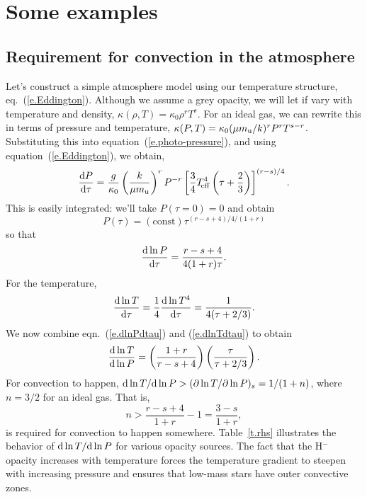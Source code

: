 \section{Some examples}

\subsection{Requirement for convection in the atmosphere}\label{s.atmosphere-convection}

Let's construct a simple atmosphere model using our temperature structure, eq.~(\ref{e.Eddington}).  Although we assume a grey opacity, we will let if vary with temperature and density, $\kappa(\rho,T) = \kappa_{0}\rho^{r}T^{s}$.  For an ideal gas, we can rewrite this in terms of pressure and temperature, $\kappa(P,T) = \kappa_{0} (\mu m_\mathrm{u}/k)^{r}P^{r} T^{s-r}$.  Substituting this into equation~(\ref{e.photo-pressure}), and using equation~(\ref{e.Eddington}), we obtain,
\[
  \frac{\mathrm{d} P}{\mathrm{d} \tau} = \frac{g}{\kappa_{0}}\left(\frac{k}{\mu m_\mathrm{u}}\right)^{r} P^{-r} \left[\frac{3}{4}T_{\!\mathrm{eff}}^{4}\left(\tau + \frac{2}{3}\right)\right]^{(r-s)/4}.
\]
This is easily integrated: we'll take $P(\tau = 0) = 0$ and obtain
\[
  P(\tau) = (\mathrm{const})\tau^{(r-s+4)/4/(1+r)}
\]
so that
\begin{equation}\label{e.dlnPdtau}
  \frac{\mathrm{d} \ln P}{\mathrm{d} \tau} = \frac{r-s+4}{4(1+r)\tau}.
\end{equation}
For the temperature,
\begin{equation}\label{e.dlnTdtau}
 \frac{\mathrm{d}\ln T}{\mathrm{d}\tau} = \frac{1}{4}\frac{\mathrm{d}\ln T^{4}}{\mathrm{d} \tau} = \frac{1}{4(\tau + 2/3)}.
\end{equation}
We now combine eqn.~(\ref{e.dlnPdtau}) and (\ref{e.dlnTdtau}) to obtain
\begin{equation}\label{e.dlnTdlnP-atmosphere}
\frac{\mathrm{d} \ln T}{\mathrm{d}\ln P} = \left(\frac{1+r}{r-s +4}\right)\left(\frac{\tau}{\tau + 2/3}\right).
\end{equation}
For convection to happen, $\mathrm{d}\ln T/\mathrm{d}\ln P > (\partial\ln T/\partial\ln P)_{s} = 1/(1+n)$, where $n = 3/2$ for an ideal gas.  That is,
\begin{equation}\label{e.convection-will-happen}
 n > \frac{r-s + 4}{1+r} - 1 = \frac{3-s}{1+r},
\end{equation}
is required for convection to happen somewhere.  Table~\ref{t.rhs} illustrates the behavior of $\mathrm{d}\ln T/\mathrm{d}\ln P$ for various opacity sources.  The fact that the H$^{-}$ opacity increases with temperature forces the temperature gradient to steepen with increasing pressure and ensures that low-mass stars have outer convective zones.

